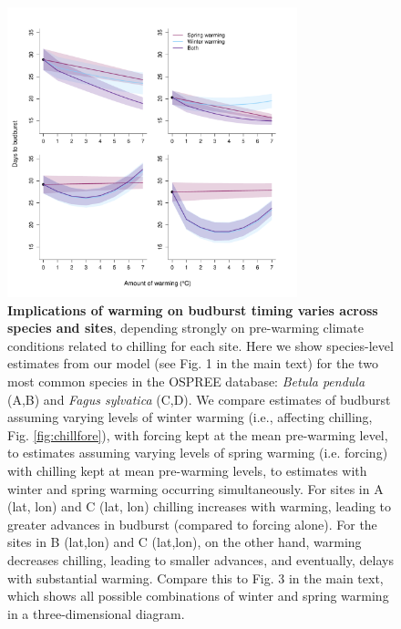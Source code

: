 \documentclass{article}
\begin{document}
\begin{figure}[h!]
\centering
\noindent \includegraphics[width=0.75\textwidth]{..//..//analyses/bb_analysis/figures/forecasting/tempforecastbothspp_1_7_degwarm.pdf}
\caption{\textbf{Implications of warming on budburst timing varies across species and sites}, depending strongly on pre-warming climate conditions related to chilling for each site. Here we show species-level estimates from our model (see Fig. 1 in the main text) for the two most common species in the OSPREE database: \emph{Betula pendula} (A,B) and \emph{Fagus sylvatica} (C,D). We compare estimates of budburst assuming varying levels of winter warming (i.e., affecting chilling, Fig. \ref{fig:chillfore}), with forcing kept at the mean pre-warming level, to estimates assuming varying levels of spring warming (i.e. forcing) with chilling kept at mean pre-warming levels, to estimates with winter and spring warming occurring simultaneously. For sites in A (lat, lon) and C (lat, lon) chilling increases with warming, leading to greater advances in budburst (compared to forcing alone). For the sites in B (lat,lon) and C (lat,lon), on the other hand, warming decreases chilling, leading to smaller advances, and eventually, delays with substantial warming. Compare  this to Fig. 3 in the main text, which shows all possible combinations of winter and spring warming in a three-dimensional diagram.}
\label{fig:betpenfagsyl}
\end{figure}
\end{document}
